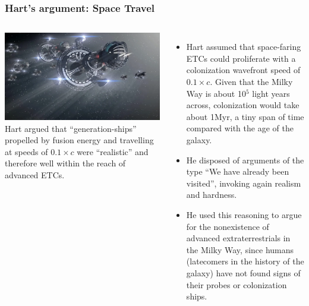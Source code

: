 \begin{frame}
\frametitle{Hart's argument: Space Travel}

\begin{columns}
\includegraphics[scale=0.1]{spaceships}
Hart argued that ``generation-ships'' propelled by fusion energy and travelling at speeds of $0.1 \times c$ were ``realistic'' and therefore well within the reach of advanced ETCs. 

\begin{itemize}

\item Hart assumed that space-faring ETCs could proliferate with a colonization wavefront speed of $0.1 \times c$. Given that the Milky Way is about 10$^5$ light years across, colonization would take  about 1Myr, a tiny span of time compared with the age of the galaxy. 

\item He disposed of arguments of the type ``We have already been visited'', invoking again realism and hardness.  

\item He used this reasoning to argue for the nonexistence of advanced extraterrestrials in the Milky Way, since humans (latecomers in the history of the galaxy) have not found signs of their probes or colonization ships.
\end{itemize}
\end{columns}
\end{frame}

